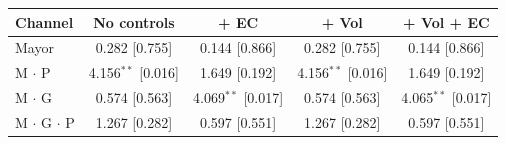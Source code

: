 \begin{tabular}{@{}lcccc@{}}
\toprule
Channel & No controls & + EC & + Vol & + Vol + EC \\
\midrule
Mayor & 0.282 [0.755] & 0.144 [0.866] & 0.282 [0.755] & 0.144 [0.866] \\
M $\cdot$ P & 4.156$^{**}$ [0.016] & 1.649 [0.192] & 4.156$^{**}$ [0.016] & 1.649 [0.192] \\
M $\cdot$ G & 0.574 [0.563] & 4.069$^{**}$ [0.017] & 0.574 [0.563] & 4.065$^{**}$ [0.017] \\
M $\cdot$ G $\cdot$ P & 1.267 [0.282] & 0.597 [0.551] & 1.267 [0.282] & 0.597 [0.551] \\
\bottomrule
\end{tabular}
